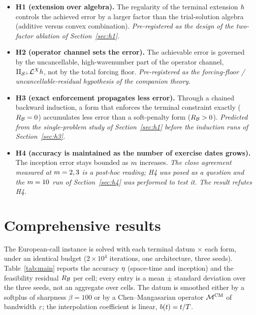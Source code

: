\documentclass[11pt]{article}
\theoremstyle{plain}
\theoremstyle{definition}
\theoremstyle{remark}
\begin{document}
\begin{itemize}
  \item \textbf{H1 (extension over algebra).} The regularity of the terminal
    extension $h$ controls the achieved error by a larger factor
    than the trial-solution algebra (additive versus convex combination).
    \emph{Pre-registered as the design of the two-factor ablation of
    Section~\ref{sec:h1}.}
  \item \textbf{H2 (operator channel sets the error).} The achievable error is
    governed by the uncancellable, high-wavenumber part of the operator channel,
    $\Pi_{\mathcal{S}^{\perp}} \mathcal{L}^{X} h$, not by the total
    forcing floor. \emph{Pre-registered as the forcing-floor / uncancellable-residual
    hypothesis of the companion theory.}
  \item \textbf{H3 (exact enforcement propagates less error).} Through a chained
    backward induction, a form that enforces the terminal constraint exactly
    ($R_{\mathcal{B}} = 0$) accumulates less error than a soft-penalty form
    ($R_{\mathcal{B}} > 0$). \emph{Predicted from the single-problem study of
    Section~\ref{sec:h1} before the induction runs of Section~\ref{sec:h3}.}
  \item \textbf{H4 (accuracy is maintained as the number of exercise dates grows).}
    The inception error stays bounded as $m$ increases. \emph{The
    close agreement measured at $m=2,3$ is a post-hoc reading; H4
    was posed as a question and the $m=10$ run of
    Section~\ref{sec:h4} was performed to test it. The result refutes H4.}
\end{itemize}

\section{Comprehensive results}\label{sec:results}

The European-call instance is solved with each terminal datum $\times$ each form,
under an identical budget ($2\times10^{4}$ iterations, one architecture, three
seeds). Table~\ref{tab:main} reports the accuracy $\eta$ (space-time and
inception) and the feasibility residual $R_{\mathcal{B}}$ per cell; every entry
is a mean $\pm$ standard deviation over the three seeds, not an aggregate over
cells. The datum is smoothed either by a softplus of sharpness $\beta=100$ or by a
Chen--Mangasarian operator $\mathcal{M}^{\mathrm{CM}}$ of bandwidth $\varepsilon$; the
interpolation coefficient is linear, $b(t)=t/T$.
\end{document}
